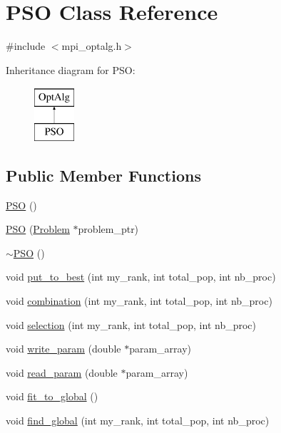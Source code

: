 \hypertarget{class_p_s_o}{}\section{P\+S\+O Class Reference}
\label{class_p_s_o}


{\ttfamily \#include $<$mpi\+\_\+optalg.\+h$>$}

Inheritance diagram for P\+S\+O\+:\begin{figure}[H]
\begin{center}
\leavevmode
\includegraphics[height=2.000000cm]{class_p_s_o}
\end{center}
\end{figure}
\subsection*{Public Member Functions}
\begin{DoxyCompactItemize}
\item 
\hyperlink{class_p_s_o_a7c23dd85e82ab8c9fd69ea9dc2528b0e}{P\+S\+O} ()
\item 
\hyperlink{class_p_s_o_a19611ceb537567770359bb5ab5c94071}{P\+S\+O} (\hyperlink{class_problem}{Problem} $\ast$problem\+\_\+ptr)
\item 
\hyperlink{class_p_s_o_a0c180ecbb9a5d7c492d47e73d448932f}{$\sim$\+P\+S\+O} ()
\item 
void \hyperlink{class_p_s_o_a1222e7701e8e369a12d293afb16fb48c}{put\+\_\+to\+\_\+best} (int my\+\_\+rank, int total\+\_\+pop, int nb\+\_\+proc)
\item 
void \hyperlink{class_p_s_o_aa056f6a9f5ea1d916dbd425888084c3a}{combination} (int my\+\_\+rank, int total\+\_\+pop, int nb\+\_\+proc)
\item 
void \hyperlink{class_p_s_o_a4816c088f061f3089b350948d27f3707}{selection} (int my\+\_\+rank, int total\+\_\+pop, int nb\+\_\+proc)
\item 
void \hyperlink{class_p_s_o_aa0b785a7ccee6b8b6e5d40d0c8100696}{write\+\_\+param} (double $\ast$param\+\_\+array)
\item 
void \hyperlink{class_p_s_o_a423f9f5a0a3b5ad7f1065e12ab050c0c}{read\+\_\+param} (double $\ast$param\+\_\+array)
\item 
void \hyperlink{class_p_s_o_a17dedf795cd91539f2cf4c4f39f71938}{fit\+\_\+to\+\_\+global} ()
\item 
void \hyperlink{class_p_s_o_a14fe336c8e970f1fdce9d91a36db3bb9}{find\+\_\+global} (int my\+\_\+rank, int total\+\_\+pop, int nb\+\_\+proc)
\end{DoxyCompactItemize}
